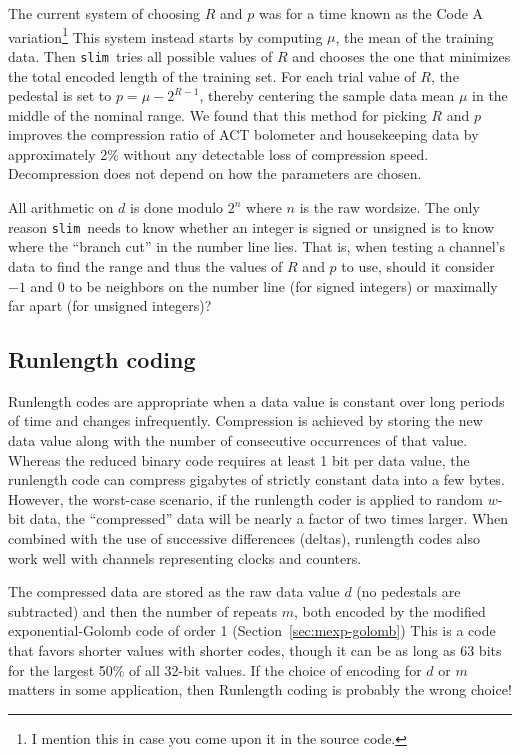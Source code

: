 \documentclass[11pt]{article}
\newcommand{\slim}{{\tt slim}}
\begin{document}
The current system of choosing $R$ and $p$ was for a time known as the
Code A variation\footnote{I mention this in case you come upon it in
the source code.}  This system instead starts by computing $\mu$, the
mean of the training data.  Then \slim\ tries all possible values of
$R$ and chooses the one that minimizes the total encoded length of the
training set. For each trial value of $R$, the pedestal is set to $p =
\mu-2^{R-1}$, thereby centering the sample data mean $\mu$ in the
middle of the nominal range.  We found that this method for picking
$R$ and $p$ improves the compression ratio of ACT bolometer and
housekeeping data by approximately 2\% without any detectable loss of
compression speed.  Decompression does not depend on how the
parameters are chosen.

All arithmetic on $d$ is done modulo $2^{n}$ where $n$ is the raw
wordsize.  The only reason \slim\ needs to know whether an integer is
signed or unsigned is to know where the ``branch cut'' in the number
line lies.  That is, when testing a channel's data to find the range
and thus the values of $R$ and $p$ to use, should it consider $-1$ and
$0$ to be neighbors on the number line (for signed integers) or
maximally far apart (for unsigned integers)?



\subsection{Runlength coding}
\label{sec:runlength}

Runlength codes are appropriate when a data value is constant over
long periods of time and changes infrequently.  Compression is
achieved by storing the new data value along with the number of
consecutive occurrences of that value.  Whereas the reduced binary
code requires at least 1 bit per data value, the runlength code can
compress gigabytes of strictly constant data into a few bytes.
However, the worst-case scenario, if the runlength coder is applied to
random $w$-bit data, the ``compressed'' data will be nearly a factor of
two times larger.  When combined with the use of successive
differences (deltas), runlength codes also work well with channels
representing clocks and counters.

The compressed data are stored as the raw data value $d$ (no pedestals
are subtracted) and then the number of repeats $m$, both encoded by
the modified exponential-Golomb code of order 1
(Section~\ref{sec:mexp-golomb})  This is a code that favors shorter
values with shorter codes, though it can be as long as 63 bits for the
largest 50\% of all 32-bit values.  If the choice of encoding for $d$
or $m$ matters in some application, then Runlength coding is probably
the wrong choice!
\end{document}
